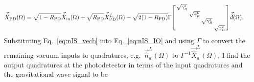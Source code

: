 \begin{align}
\label{eq:nIS_IO}
\vec{\hat X}_\mathrm{PD}(\Omega)&=\sqrt{1-R_\text{PD}}\vec{\hat X}_\mathrm{in}(\Omega)+\sqrt{R_\text{PD}}\vec{\hat X}^L_\text{PD}(\Omega)-\sqrt{2(1-R_\text{PD})}\Gamma\begin{bsmallmatrix}
\sqrt{\gamma^b_R} &  &  &  \\
 & \sqrt{\gamma^b_R} &  &  \\
 &  & \sqrt{\gamma^c_R} &  \\
 &  &  & \sqrt{\gamma^c_R}
\end{bsmallmatrix}\vec{\hat d}(\Omega).
\end{align}
Substituting Eq.~\ref{eq:nIS_vecb} into Eq.~\ref{eq:nIS_IO} and using $\Gamma$ to convert the remaining vacuum inputs to quadratures, e.g.\ $\vec{\hat{n}}^L_a(\Omega)$ to $\Gamma^{-1}\vec{\hat X}^L_a(\Omega)$, I find the output quadratures at the photodetector in terms of the input quadratures and the gravitational-wave signal to be
\begingroup
\allowdisplaybreaks
